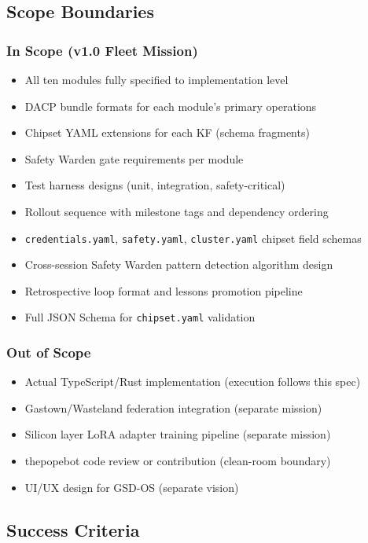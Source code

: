 \documentclass[11pt,letterpaper]{article}
\begin{document}
\subsection{Scope Boundaries}

\subsubsection{In Scope (v1.0 Fleet Mission)}
\begin{itemize}[noitemsep]
  \item All ten modules fully specified to implementation level
  \item DACP bundle formats for each module's primary operations
  \item Chipset YAML extensions for each KF (schema fragments)
  \item Safety Warden gate requirements per module
  \item Test harness designs (unit, integration, safety-critical)
  \item Rollout sequence with milestone tags and dependency ordering
  \item \texttt{credentials.yaml}, \texttt{safety.yaml}, \texttt{cluster.yaml} chipset field schemas
  \item Cross-session Safety Warden pattern detection algorithm design
  \item Retrospective loop format and lessons promotion pipeline
  \item Full JSON Schema for \texttt{chipset.yaml} validation
\end{itemize}

\subsubsection{Out of Scope}
\begin{itemize}[noitemsep]
  \item Actual TypeScript/Rust implementation (execution follows this spec)
  \item Gastown/Wasteland federation integration (separate mission)
  \item Silicon layer LoRA adapter training pipeline (separate mission)
  \item thepopebot code review or contribution (clean-room boundary)
  \item UI/UX design for GSD-OS (separate vision)
\end{itemize}

\subsection{Success Criteria}
\end{document}
